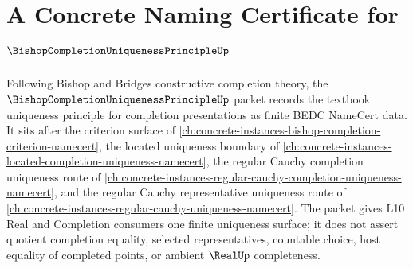 \chapter{A Concrete Naming Certificate for $\BishopCompletionUniquenessPrincipleUp$}
\label{ch:concrete-instances-bishop-completion-uniqueness-principle-namecert}

Following Bishop and Bridges constructive completion theory, the $\BishopCompletionUniquenessPrincipleUp$ packet records the textbook uniqueness principle for completion presentations as finite BEDC NameCert data. It sits after the criterion surface of \autoref{ch:concrete-instances-bishop-completion-criterion-namecert}, the located uniqueness boundary of \autoref{ch:concrete-instances-located-completion-uniqueness-namecert}, the regular Cauchy completion uniqueness route of \autoref{ch:concrete-instances-regular-cauchy-completion-uniqueness-namecert}, and the regular Cauchy representative uniqueness route of \autoref{ch:concrete-instances-regular-cauchy-uniqueness-namecert}. The packet gives L10 Real and Completion consumers one finite uniqueness surface; it does not assert quotient completion equality, selected representatives, countable choice, host equality of completed points, or ambient $\RealUp$ completeness.

